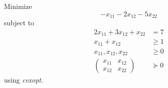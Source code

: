 \documentclass[journal,12pt,twocolumn]{IEEEtran}
\begin{document}
\begin{problem}
Minimize 
\begin{equation}
-x_{11} - 2x_{12} - 5x_{22}
\end{equation}
subject to
\begin{align}
\label{ch3_lin_mat_ineq_const}
2x_{11} + 3x_{12} + x_{22} &= 7 \\
x_{11} + x_{12} &\geq 1 \\
x_{11}, x_{12}, x_{22} &\geq 0 \\
\begin{pmatrix}
x_{11} & x_{12} \\
x_{12} & x_{22}
\end{pmatrix} & \succeq 0 
\end{align}
using {\em cvxopt}.
\end{problem}
\end{document}
